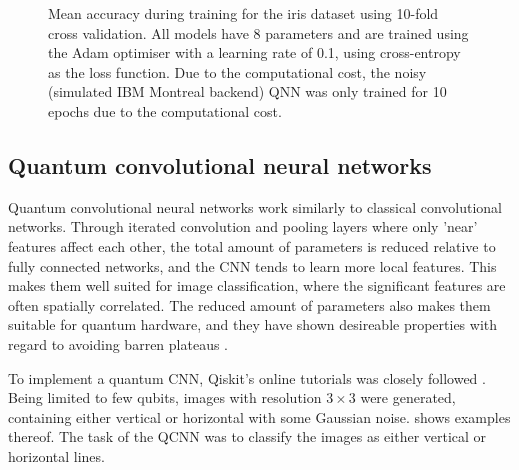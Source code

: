 \begin{figure}
    \centering
    \caption{Mean accuracy during training for the iris dataset using 10-fold cross validation. All models have 8 parameters and are trained using the Adam optimiser with a learning rate of 0.1, using cross-entropy as the loss function. Due to the computational cost, the noisy (simulated IBM Montreal backend) QNN was only trained for 10 epochs due to the computational cost.}
    \label{fig:iris_training}
\end{figure}

\subsection{Quantum convolutional neural networks}
Quantum convolutional neural networks work similarly to classical convolutional networks. Through iterated convolution and pooling layers where only 'near' features affect each other, the total amount of parameters is reduced relative to fully connected networks, and the CNN tends to learn more local features. This makes them well suited for image classification, where the significant features are often spatially correlated. The reduced amount of parameters also makes them suitable for quantum hardware, and they have shown desireable properties with regard to avoiding barren plateaus \cite{pesah2021}.

To implement a quantum CNN, Qiskit's online tutorials was closely followed \cite{qiskit_qcnn}. Being limited to few qubits, images with resolution $3\times3$ were generated, containing either vertical or horizontal with some Gaussian noise.  shows examples thereof. The task of the QCNN was to classify the images as either vertical or horizontal lines.


